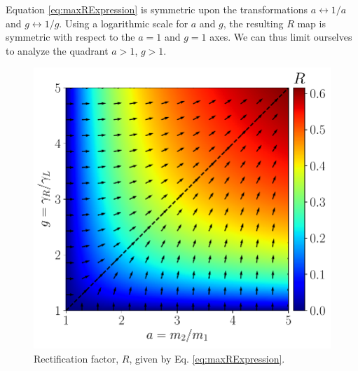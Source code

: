 Equation \eqref{eq:maxRExpression} is symmetric upon the transformations $a \leftrightarrow 1/a$ and $g \leftrightarrow 1/g$. Using a logarithmic scale for $a$ and $g$, the resulting $R$ map is symmetric with respect to the $a=1$ and $g=1$ axes. We can thus limit ourselves to analyze the quadrant $a > 1$, $g > 1$.


\begin{figure}
  \center
  \includegraphics[width=\linewidth]{Figures/Rade.pdf}
  \caption{Rectification factor, $R$, given by Eq. \eqref{eq:maxRExpression}.}
  \label{fig:R_g_a_plane}
\end{figure}

